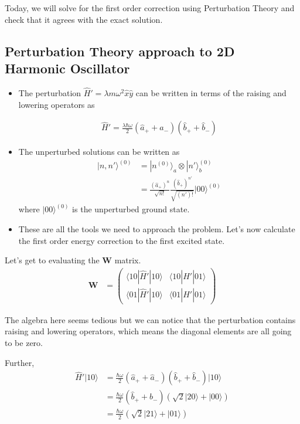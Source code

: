 \documentclass{article}
\newcommand{\ket}[1]{|#1 \rangle}
\newcommand{\inner}[2]{\langle #1 | #2 \rangle}
\begin{document}
\vskip 0.5cm
Today, we will solve for the first order correction using Perturbation Theory and check that it agrees with the exact solution.

\vskip 1cm
\subsection{Perturbation Theory approach to 2D Harmonic Oscillator}

\vskip 0.5cm
\begin{itemize}
  \item The perturbation $\hat{H}' = \lambda m\omega^2 \hat{x}\hat{y}$ can be written in terms of the raising and lowering operators as

  \begin{align*}
    \hat{H}' = \frac{\lambda \hbar \omega}{2} \left( \hat{a}_{+} + \hat{a}_{-} \right) \left( \hat{b}_{+} + \hat{b}_{-} \right)
  \end{align*}
  
  
  \item The unperturbed solutions can be written as 
  \begin{align*}
    \ket{n, n'}^{(0)} &= \ket{n^{(0)}}_a \otimes \ket{n'}^{(0)}_b \\
    &= \frac{(\hat{a}_{+})^n}{\sqrt{n!}} \frac{(\hat{b}_{+})^{n'}}{\sqrt{(n')!}} \ket{00}^{(0)}
  \end{align*}
  where $\ket{00}^{(0)}$ is the unperturbed ground state.

  \item These are all the tools we need to approach the problem. Let's now calculate the first order energy correction to the first excited state.  
\end{itemize}

\vskip 0.5cm
Let's get to evaluating the $\mathbf{W}$ matrix.
\begin{align*}
  \mathbf{W} &= \begin{pmatrix}
    \inner{10}{\hat{H}'|10} & \inner{10}{\hat{H}'|01} \\
    \inner{01}{\hat{H}'|10} & \inner{01}{\hat{H}'|01} 
  \end{pmatrix}
\end{align*}

\vskip 0.25cm
The algebra here seems tedious but we can notice that the perturbation contains raising and lowering operators, which means the diagonal elements are all going to be zero.

\vskip 0.25cm
Further,
\begin{align*}
  \hat{H}' \ket{10} &= \frac{\hbar \omega}{2} \left( \hat{a}_{+} + \hat{a}_{-}  \right) \left( \hat{b}_{+} + \hat{b}_{-}  \right) \ket{10} \\
  &= \frac{\hbar \omega}{2} \left( \hat{b}_{+} + \hat{b}_{-}  \right) \left( \sqrt{2}\ket{2 0} + \ket{00} \right) \\
  &= \frac{\hbar \omega}{2} \left(\sqrt{2} \ket{2 1} + \ket{0 1}\right) 
\end{align*}
\end{document}
